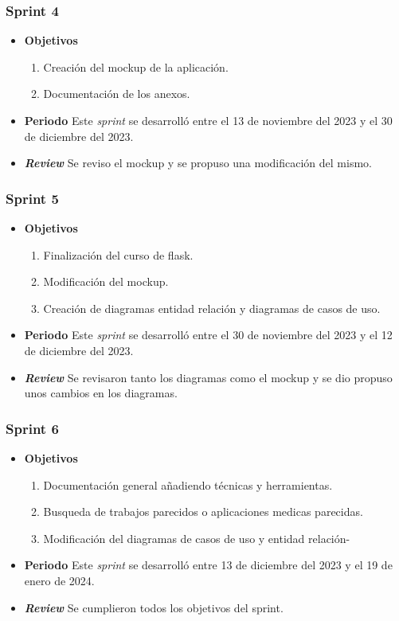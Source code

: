\subsubsection{Sprint 4}
\begin{itemize}
\item \textbf{Objetivos}
\begin{enumerate}
\item Creación del mockup de la aplicación.
\item Documentación de los anexos.
\end{enumerate}
\item \textbf{Periodo}
Este \textsl{sprint} se desarrolló entre el 13 de noviembre del 2023 y el 30 de diciembre del 2023.
\item \textbf{\textsl{Review}}
Se reviso el mockup y se propuso una modificación del mismo. 


\end{itemize}


\subsubsection{Sprint 5}
\begin{itemize}
\item \textbf{Objetivos}
\begin{enumerate}
\item Finalización del curso de flask.
\item Modificación del mockup.
\item Creación de diagramas entidad relación y diagramas de casos de uso.
\end{enumerate}
\item \textbf{Periodo}
Este \textsl{sprint} se desarrolló entre el 30 de noviembre del 2023 y el 12 de diciembre del 2023.
\item \textbf{\textsl{Review}}
Se revisaron tanto los diagramas como el mockup y se dio propuso unos cambios en los diagramas. 


\end{itemize}

\subsubsection{Sprint 6}
\begin{itemize}
\item \textbf{Objetivos}
\begin{enumerate}
\item Documentación general añadiendo técnicas y herramientas.
\item Busqueda de trabajos parecidos o aplicaciones medicas parecidas.
\item Modificación del diagramas de casos de uso y entidad relación-
\end{enumerate}
\item \textbf{Periodo}
Este \textsl{sprint} se desarrolló entre 13 de diciembre del 2023 y el 19 de enero de 2024.
\item \textbf{\textsl{Review}}
Se cumplieron todos los objetivos del sprint. 


\end{itemize}
